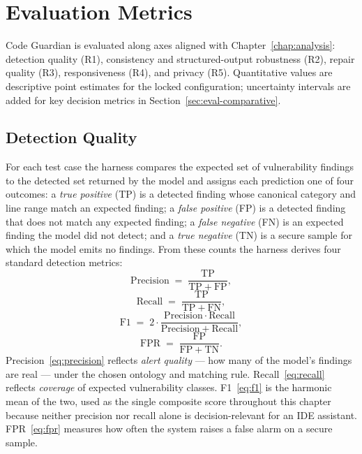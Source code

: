 \section{Evaluation Metrics}
\label{sec:eval-metrics}

Code Guardian is evaluated along axes aligned with Chapter~\ref{chap:analysis}: detection quality (R1), consistency and structured-output robustness (R2), repair quality (R3), responsiveness (R4), and privacy (R5). Quantitative values are descriptive point estimates for the locked configuration; uncertainty intervals are added for key decision metrics in Section~\ref{sec:eval-comparative}.

\subsection{Detection Quality}
\label{subsec:eval-metrics-detection}

For each test case the harness compares the expected set of vulnerability findings to the detected set returned by the model and assigns each prediction one of four outcomes: a \emph{true positive} (TP) is a detected finding whose canonical category and line range match an expected finding; a \emph{false positive} (FP) is a detected finding that does not match any expected finding; a \emph{false negative} (FN) is an expected finding the model did not detect; and a \emph{true negative} (TN) is a secure sample for which the model emits no findings. From these counts the harness derives four standard detection metrics:
%
\begin{equation}
\mathrm{Precision} \;=\; \frac{\mathrm{TP}}{\mathrm{TP}+\mathrm{FP}},
\label{eq:precision}
\end{equation}
%
\begin{equation}
\mathrm{Recall} \;=\; \frac{\mathrm{TP}}{\mathrm{TP}+\mathrm{FN}},
\label{eq:recall}
\end{equation}
%
\begin{equation}
\mathrm{F1} \;=\; 2 \cdot \frac{\mathrm{Precision} \cdot \mathrm{Recall}}{\mathrm{Precision} + \mathrm{Recall}},
\label{eq:f1}
\end{equation}
%
\begin{equation}
\mathrm{FPR} \;=\; \frac{\mathrm{FP}}{\mathrm{FP}+\mathrm{TN}}.
\label{eq:fpr}
\end{equation}
%
Precision~\eqref{eq:precision} reflects \emph{alert quality} --- how many of the model's findings are real --- under the chosen ontology and matching rule. Recall~\eqref{eq:recall} reflects \emph{coverage} of expected vulnerability classes. F1~\eqref{eq:f1} is the harmonic mean of the two, used as the single composite score throughout this chapter because neither precision nor recall alone is decision-relevant for an IDE assistant. FPR~\eqref{eq:fpr} measures how often the system raises a false alarm on a secure sample.

